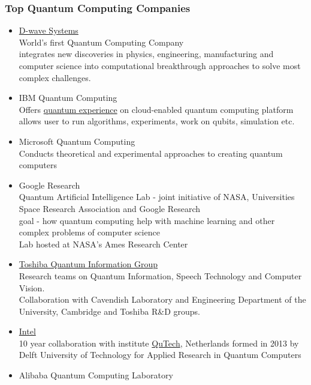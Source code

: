 \documentclass[xcolor=x11names,table]{beamer}
\begin{document}
	\begin{frame}[allowframebreaks]
		\frametitle{Top Quantum Computing Companies}
		\begin{itemize}
			\item \href{https://www.dwavesys.com/}{D-wave Systems}
			\\ {\scriptsize
				World's first Quantum Computing Company
				\\ integrates new discoveries in physics, engineering, manufacturing and computer science into computational breakthrough approaches to solve most complex challenges.
			}
			\item IBM Quantum Computing
			\\ {\scriptsize Offers \href{https://quantumexperience.ng.bluemix.net/}{quantum experience} on cloud-enabled quantum computing platform
				\\ allows user to run algorithms, experiments, work on qubits, simulation etc.}
			\item Microsoft Quantum Computing
			\\ {\scriptsize Conducts theoretical and experimental approaches to creating quantum computers}
			\item Google Research
			\\ {\scriptsize
				Quantum Artificial Intelligence Lab - joint initiative of NASA, Universities Space Research Association and Google Research
				\\ goal - how quantum computing help with machine learning and other complex problems of computer science
				\\ Lab hosted at NASA's Ames Research Center
			}
			\item \href{www.toshiba.eu/eu/Cambridge-Research-Laboratory/Quantum-Information-Group/}{Toshiba Quantum Information Group}
			\\ {\scriptsize
				Research teams on Quantum Information, Speech Technology and Computer Vision.
				\\ Collaboration with Cavendish Laboratory and Engineering Department of the University, Cambridge and Toshiba R\&D groups.
			}
			\item \href{https://newsroom.intel.com/tag/qutech/}{Intel}
			\\ {\scriptsize 
				10 year collaboration with institute \href{https://qutech.nl/qutechentersintocollaborationwithintel/}{QuTech}, Netherlands formed in 2013 by Delft University of Technology for Applied Research in Quantum Computers
			}
			\item Alibaba Quantum Computing Laboratory

\end{itemize}
\end{frame}
\end{document}
